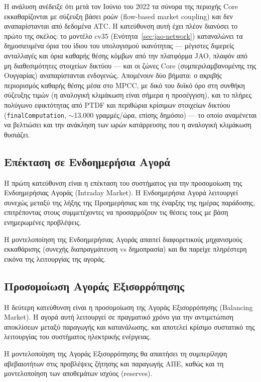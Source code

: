 Η ανάλυση ανέδειξε ότι μετά τον Ιούνιο του 2022 τα σύνορα της περιοχής Core εκκαθαρίζονται με σύζευξη βάσει ροών (flow-based market coupling) και δεν αναπαρίστανται από δεδομένα ATC. Η κατεύθυνση αυτή έχει πλέον διανύσει το πρώτο της σκέλος: το μοντέλο cv35 (Ενότητα~\ref{sec:jao-network}) καταναλώνει τα δημοσιευμένα όρια του ίδιου του υπολογισμού ικανότητας --- μέγιστες διμερείς ανταλλαγές και όρια καθαρής θέσης κόμβων από την πλατφόρμα JAO, πλαφόν από μη διαθεσιμότητες στοιχείων δικτύου --- και οι ζώνες Core (συμπεριλαμβανομένης της Ουγγαρίας) αναπαρίστανται ενδογενώς. Απομένουν δύο βήματα: ο \emph{ακριβής} περιορισμός καθαρής θέσης μέσα στο MPCC, με δικό του δυϊκό όρο στη συνθήκη σύζευξης τιμών (η αναλογική κλιμάκωση είναι σήμερα η προσέγγιση), και το πλήρες πολύγωνο εφικτότητας από PTDF και περιθώρια κρίσιμων στοιχείων δικτύου (\texttt{finalComputation}, $\sim$13.000 γραμμές/ώρα, επίσης δημόσιο) --- το οποίο αναμένεται να βελτιώσει και την ανάκληση των ωρών κατάρρευσης που η αναλογική κλιμάκωση θυσιάζει.

\subsection{Επέκταση σε Ενδοημερήσια Αγορά}
\label{subsec:intraday-extension}

Η πρώτη κατεύθυνση είναι η επέκταση του συστήματος για την προσομοίωση της Ενδοημερήσιας Αγοράς (Intraday Market). Η Ενδοημερήσια Αγορά λειτουργεί συνεχώς μεταξύ της λήξης της Προημερήσιας και της έναρξης της ημέρας παράδοσης, επιτρέποντας στους συμμετέχοντες να προσαρμόζουν τις θέσεις τους με βάση ενημερωμένες προβλέψεις.

Η μοντελοποίηση της Ενδοημερήσιας Αγοράς απαιτεί διαφορετικούς μηχανισμούς εκκαθάρισης (συνεχής διαπραγμάτευση vs δημοπρασία) και θα παρείχε πληρέστερη εικόνα της λειτουργίας της αγοράς.

\subsection{Προσομοίωση Αγοράς Εξισορρόπησης}
\label{subsec:balancing-simulation}

Η δεύτερη κατεύθυνση είναι η προσομοίωση της Αγοράς Εξισορρόπησης (Balancing Market). Η αγορά αυτή λειτουργεί σε πραγματικό χρόνο για την αντιμετώπιση αποκλίσεων μεταξύ παραγωγής και κατανάλωσης, και αποτελεί κρίσιμο συστατικό της λειτουργίας του συστήματος ηλεκτρικής ενέργειας.

Η μοντελοποίηση της Αγοράς Εξισορρόπησης θα απαιτήσει τη συμπερίληψη αβεβαιοτήτων στις προβλέψεις ζήτησης και παραγωγής ΑΠΕ, καθώς και τη μοντελοποίηση των αποθεμάτων ισχύος (reserves).

